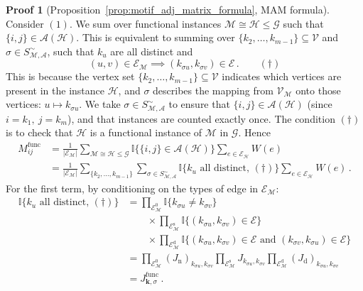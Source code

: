 \documentclass[12pt,draft]{ociamthesis}
\theoremstyle{plain}
\theoremstyle{definition}
\newtheorem{prf}{Proof}[chapter]
\theoremstyle{remark}
\newcommand\bb[1]{\mathbb{#1}}
\newcommand\ca[1]{\mathcal{#1}}
\begin{document}
\begin{prf}[Proposition~\ref{prop:motif_adj_matrix_formula}, MAM formula]
  \label{proof:motif_adj_matrix_formula}
  Consider $(1)$. We sum over functional instances $\ca{M} \cong \ca{H} \leq
  \ca{G}$ such that $\{i,j\} \in \ca{A(H)}$.
  This is equivalent to summing over $\{k_2, \ldots, k_{m-1}\} \subseteq
  \ca{V}$ and $\sigma \in S_\ca{M,A}^\sim$, such that $k_u$ are all distinct
  and
  $$ (u,v) \in \ca{E_M} \implies (k_{\sigma u}, k_{\sigma v}) \in \ca{E}\,.
  \qquad (\dagger) $$
  This is because the vertex set $\{k_2, \ldots, k_{m-1}\} \subseteq \ca{V}$
  indicates which vertices are present in the instance $\ca{H}$, and $\sigma$
  describes the mapping from $\ca{V_M}$ onto those vertices: $u \mapsto
  k_{\sigma u}$. We take $\sigma \in S_\ca{M,A}^\sim$ to ensure that $\{i,j\}
  \in \ca{A(H)}$ (since $i=k_1, \ j=k_m$), and that instances are counted
  exactly once.
  The condition $(\dagger)$ is to check that $\ca{H}$ is a functional instance
  of $\ca{M}$ in $\ca{G}$. Hence
  \begin{align*}
    M^\mathrm{func}_{i j} &= \frac{1}{|\ca{E_M}|}
    \sum_{\ca{M} \cong \ca{H} \leq
    \ca{G}} \bb{I} \big\{ \{i,j\} \in \ca{A}(\ca{H}) \big\} \sum_{e \in
    \ca{E_H}} W(e) \\
    &=  \frac{1}{|\ca{E_M}|} \sum_{\{ k_2, \ldots, k_{m-1} \}} \sum_{\sigma \in
    S_\ca{M,A}^\sim} \bb{I} \big\{ k_u \textrm{ all distinct}, \, (\dagger)
    \big\} \sum_{e \in \ca{E_H}} W(e)\,.
  \end{align*}
  For the first term, by conditioning on the types of edge in $\ca{E_M}$:
  \begin{align*}
    \bb{I} \big\{ k_u \textrm{ all distinct}, \, (\dagger) \big\}
    &= \prod_{\ca{E}_\ca{M}^0} \bb{I} \{ k_{\sigma u} \neq k_{\sigma v} \} \\
    & \qquad \times \prod_{\ca{E}_\ca{M}^\mathrm{s}} \bb{I} \{ (k_{\sigma u},
    k_{\sigma v}) \in \ca{E} \} \\
    & \qquad \times \prod_{\ca{E}_\ca{M}^\mathrm{d}} \bb{I} \{(k_{\sigma u},
      k_{\sigma v}) \in \ca{E} \textrm{ and } (k_{\sigma v}, k_{\sigma u}) \in
    \ca{E}\} \\
    &= \prod_{\ca{E}_\ca{M}^0} (J_\mathrm{n})_{k_{\sigma u},k_{\sigma v}}
    \prod_{\ca{E}_\ca{M}^\mathrm{s}} J_{k_{\sigma u},k_{\sigma v}}
    \prod_{\ca{E}_\ca{M}^\mathrm{d}} (J_\mathrm{d})_{k_{\sigma u},k_{\sigma v}}
    \\
    &= J^\mathrm{func}_{\mathbf{k},\sigma}\,.

\end{align*}
\end{prf}
\end{document}
